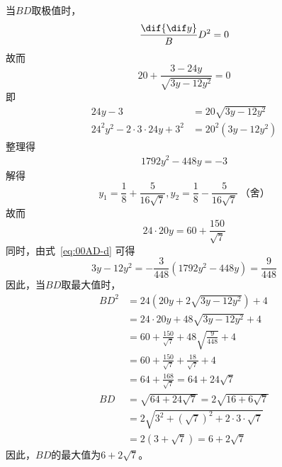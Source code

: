 当$BD$取极值时，
\[ \frac\dif{\dif y}BD^2 = 0 \]
故而
\[ 20 + \frac{3 - 24y}{\sqrt{3y - 12y^2}} = 0 \]
即
\begin{align*}
  24y - 3 &= 20\sqrt{3y - 12y^2} \\
  24^2y^2 - 2\cdot3\cdot24y + 3^2 &= 20^2\left(3y - 12y^2\right)
\end{align*}
整理得
\begin{align}
  1792y^2 - 448y = -3 \label{eq:00AD-d}
\end{align}
解得
\[ y_1 = \frac18 + \frac5{16\sqrt7}, y_2 = \frac18 - \frac5{16\sqrt7}\ \text{（舍）} \]
故而
\[ 24\cdot20y = 60 + \frac{150}{\sqrt7} \]
同时，由式~\ref{eq:00AD-d} 可得
\[ 3y - 12y^2 = -\frac3{448}\left(1792y^2 - 448y\right) = \frac9{448} \]
因此，当$BD$取最大值时，
\begin{align*}
  BD^2 &= 24\left(20y + 2\sqrt{3y - 12y^2}\right) + 4 \\
  &= 24\cdot20y + 48\sqrt{3y - 12y^2} + 4 \\
  &= 60 + \frac{150}{\sqrt7} + 48\sqrt{\frac9{448}} + 4 \\
  &= 60 + \frac{150}{\sqrt7} + \frac{18}{\sqrt7} + 4 \\
  &= 64 + \frac{168}{\sqrt7} = 64 + 24\sqrt7 \\
  BD &= \sqrt{64 + 24\sqrt7} = 2\sqrt{16 + 6\sqrt7} \\
  &= 2\sqrt{3^2 + \left(\sqrt7\right)^2 + 2\cdot3\cdot\sqrt7} \\
  &= 2\left(3 + \sqrt7\right) = 6 + 2\sqrt7
\end{align*}
因此，$BD$的最大值为$6 + 2\sqrt7$。
